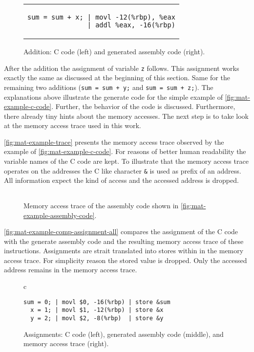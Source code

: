 \documentclass[onecolumn, openany, master, english, seal, signatures]{dbrgrptt}
\begin{document}
\begin{figure}[h!]
  \centering
  \begin{tabular}{c}
  \begin{lstlisting}
sum = sum + x; | movl -12(%rbp), %eax
               | addl %eax, -16(%rbp)
  \end{lstlisting}
  \end{tabular}
  \caption{Addition: C code (left) and generated assembly code (right).}
  \label{fig:mat-example-comp-addition}
\end{figure}

After the addition the assignment of variable \texttt{z} follows. This assignment works exactly the same as discussed at the beginning of this section. Same for the remaining two additions (\texttt{sum = sum + y;} and \texttt{sum = sum + z;}). The explanations above illustrate the generate code for the simple example of \autoref{fig:mat-example-c-code}. Further, the behavior of the code is discussed. Furthermore, there already tiny hints about the memory accesses. The next step is to take look at the memory access trace used in this work.

\autoref{fig:mat-example-trace} presents the memory access trace observed by the example of \autoref{fig:mat-example-c-code}. For reasons of better human readability the variable names of the C code are kept. To illustrate that the memory access trace operates on the addresses the C like character \texttt{&} is used as prefix of an address. All information expect the kind of access and the accessed address is dropped.

\begin{figure}[h!]
  \centering
  \begin{tabular}{c}
  
  \end{tabular}
  \caption{Memory access trace of the assembly code shown in \autoref{fig:mat-example-assembly-code}.}
  \label{fig:mat-example-trace}
\end{figure}

\autoref{fig:mat-example-comp-assignment-all} compares the assignment of the C code with the generate assembly code and the resulting memory access trace of these instructions. Assignments are strait translated into stores within in the memory access trace. For simplicity reason the stored value is dropped. Only the accessed address remains in the memory access trace.

\begin{figure}[h!]
  \centering
  \begin{tabular}{c}
  \begin{lstlisting}
sum = 0; | movl $0, -16(%rbp) | store &sum
  x = 1; | movl $1, -12(%rbp) | store &x
  y = 2; | movl $2, -8(%rbp)  | store &y
  \end{lstlisting}
  \end{tabular}
  \caption{Assignments: C code (left), generated assembly code (middle), and memory access trace (right).}
  \label{fig:mat-example-comp-assignment-all}
\end{figure}
\end{document}
